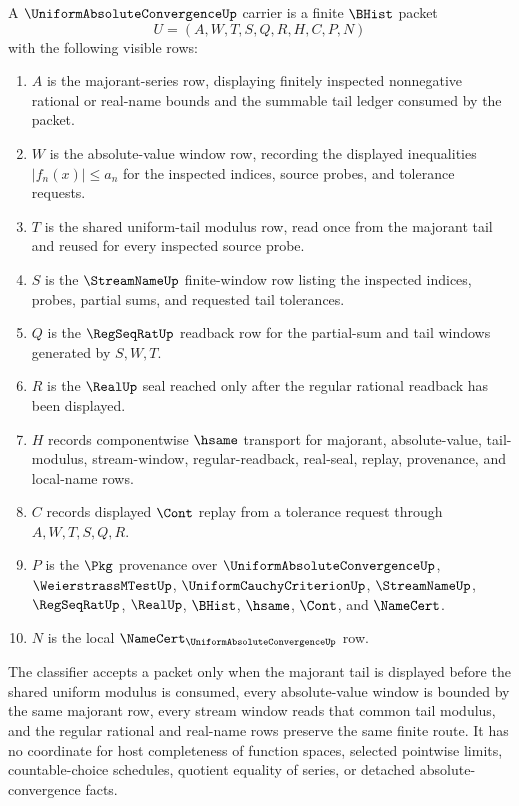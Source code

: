 \begin{definition}
\label{def:uniform-absolute-convergence-carrier}
A $\UniformAbsoluteConvergenceUp$ carrier is a finite $\BHist$ packet
$$
U=(A,W,T,S,Q,R,H,C,P,N)
$$
with the following visible rows:
\begin{enumerate}
\item $A$ is the majorant-series row, displaying finitely inspected nonnegative rational or real-name bounds and the summable tail ledger consumed by the packet.
\item $W$ is the absolute-value window row, recording the displayed inequalities $|f_n(x)|\leq a_n$ for the inspected indices, source probes, and tolerance requests.
\item $T$ is the shared uniform-tail modulus row, read once from the majorant tail and reused for every inspected source probe.
\item $S$ is the $\StreamNameUp$ finite-window row listing the inspected indices, probes, partial sums, and requested tail tolerances.
\item $Q$ is the $\RegSeqRatUp$ readback row for the partial-sum and tail windows generated by $S,W,T$.
\item $R$ is the $\RealUp$ seal reached only after the regular rational readback has been displayed.
\item $H$ records componentwise $\hsame$ transport for majorant, absolute-value, tail-modulus, stream-window, regular-readback, real-seal, replay, provenance, and local-name rows.
\item $C$ records displayed $\Cont$ replay from a tolerance request through $A,W,T,S,Q,R$.
\item $P$ is the $\Pkg$ provenance over $\UniformAbsoluteConvergenceUp$, $\WeierstrassMTestUp$, $\UniformCauchyCriterionUp$, $\StreamNameUp$, $\RegSeqRatUp$, $\RealUp$, $\BHist$, $\hsame$, $\Cont$, and $\NameCert$.
\item $N$ is the local $\NameCert_{\UniformAbsoluteConvergenceUp}$ row.
\end{enumerate}
The classifier accepts a packet only when the majorant tail is displayed before the shared uniform modulus is consumed, every absolute-value window is bounded by the same majorant row, every stream window reads that common tail modulus, and the regular rational and real-name rows preserve the same finite route. It has no coordinate for host completeness of function spaces, selected pointwise limits, countable-choice schedules, quotient equality of series, or detached absolute-convergence facts.
\end{definition}

